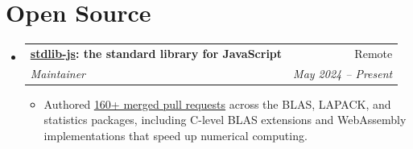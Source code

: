 \documentclass[a4paper,10pt]{article}
\makeatletter
\newcommand{\entry}[4]{%
  \item\begin{tabular*}{0.98\textwidth}[t]{l@{\extracolsep{\fill}}r}
    \textbf{#1} & #2 \\
    \textit{\small #3} & \textit{\small #4} \\
  \end{tabular*}\vspace{-6pt}}
\newenvironment{entries}{\begin{itemize}[leftmargin=0.12in,label={},itemsep=1pt,topsep=1pt]}{\end{itemize}}
\newenvironment{points}{\begin{itemize}[leftmargin=0.2in,itemsep=0pt,topsep=1pt,parsep=0pt,label={\tiny$\bullet$}]\small}{\end{itemize}\vspace{-3pt}}
\makeatother
\begin{document}
\section{Open Source}
\begin{entries}
  \entry{\href{https://github.com/stdlib-js/stdlib}{stdlib-js}: the standard library for JavaScript}{Remote}
        {Maintainer}{May 2024 -- Present}
  \begin{points}
    \item Authored \href{https://github.com/stdlib-js/stdlib/pulls?q=is\%3Apr+author\%3A0PrashantYadav0+is\%3Amerged}{\underline{160+ merged pull requests}} across the BLAS, LAPACK, and statistics packages, including C-level BLAS extensions and WebAssembly implementations that speed up numerical computing.
  \end{points}
\end{entries}

\end{document}
